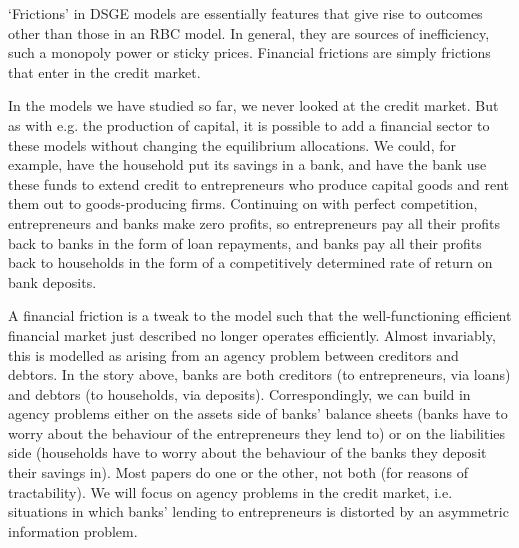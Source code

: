 \documentclass[11pt,letterpaper,reqno,oneside]{article}
\begin{document}
`Frictions' in DSGE models are essentially features that give rise to outcomes other than those in an RBC model. In general, they are sources of inefficiency, such a monopoly power or sticky prices. Financial frictions are simply frictions that enter in the credit market.

In the models we have studied so far, we never looked at the credit market. But as with e.g. the production of capital, it is possible to add a financial sector to these models without changing the equilibrium allocations. We could, for example, have the household put its savings in a bank, and have the bank use these funds to extend credit to entrepreneurs who produce capital goods and rent them out to goods-producing firms. Continuing on with perfect competition, entrepreneurs and banks make zero profits, so entrepreneurs pay all their profits back to banks in the form of loan repayments, and banks pay all their profits back to households in the form of a competitively determined rate of return on bank deposits.

A financial friction is a tweak to the model such that the well-functioning efficient financial market just described no longer operates efficiently. Almost invariably, this is modelled as arising from an agency problem between creditors and debtors. In the story above, banks are both creditors (to entrepreneurs, via loans) and debtors (to households, via deposits). Correspondingly, we can build in agency problems either on the assets side of banks' balance sheets (banks have to worry about the behaviour of the entrepreneurs they lend to) or on the liabilities side (households have to worry about the behaviour of the banks they deposit their savings in). Most papers do one or the other, not both (for reasons of tractability). We will focus on agency problems in the credit market, i.e. situations in which banks' lending to entrepreneurs is distorted by an asymmetric information problem.
\end{document}
